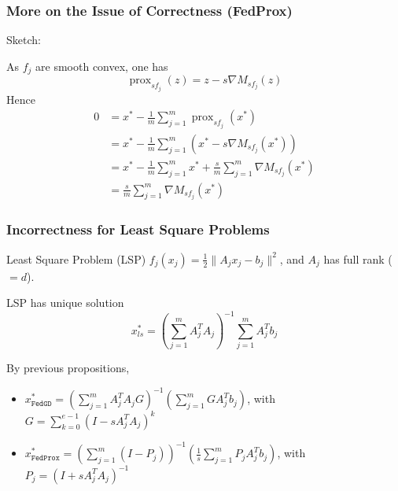 
\begin{frame}
\frametitle{More on the Issue of Correctness (FedProx)}

Sketch:

As $f_j$ are smooth convex, one has
$$\operatorname{prox}_{sf_j}(z) = z - s\nabla M_{sf_j}(z)$$
Hence
{\smaller
\begin{align*}
0 & = x^* - \frac{1}{m}\sum_{j=1}^m \operatorname{prox}_{sf_j}(x^*) \\
& = x^* - \frac{1}{m}\sum_{j=1}^m \left( x^* - s\nabla M_{sf_j}(x^*) \right) \\
& = x^* - \frac{1}{m}\sum_{j=1}^m x^* + \frac{s}{m}\sum_{j=1}^m\nabla M_{sf_j}(x^*) \\
& = \frac{s}{m}\sum_{j=1}^m\nabla M_{sf_j}(x^*)
\end{align*}
}

\end{frame}


\begin{frame}
\frametitle{Incorrectness for Least Square Problems}

\begin{block}{Least Square Problem (LSP)}
$f_j(x_j) = \frac12 \lVert A_jx_j-b_j \rVert^2$, and $A_j$ has full rank ($=d$).
\end{block}

LSP has unique solution
{\smaller
$$x^*_{ls} = \left( \sum_{j=1}^m A_j^TA_j \right)^{-1} \sum_{j=1}^m A_j^Tb_j$$
}

\pause

By previous propositions,
\begin{itemize}
    \item {\smaller$x^*_{\texttt{FedGD}} = \left( \sum\limits_{j=1}^m A_j^TA_j G \right)^{-1}\left( \sum\limits_{j=1}^m GA_j^Tb_j \right)$, with $G = \sum\limits_{k=0}^{e-1}(I-sA_j^TA_j)^k$}
    \item {\smaller$x^*_{\texttt{FedProx}} = \left( \sum\limits_{j=1}^m \left( I - P_j \right) \right)^{-1}\left( \frac{1}{s}\sum\limits_{j=1}^m P_jA_j^Tb_j \right)$, with $P_j = (I+sA_j^TA_j)^{-1}$}
\end{itemize}

\end{frame}



